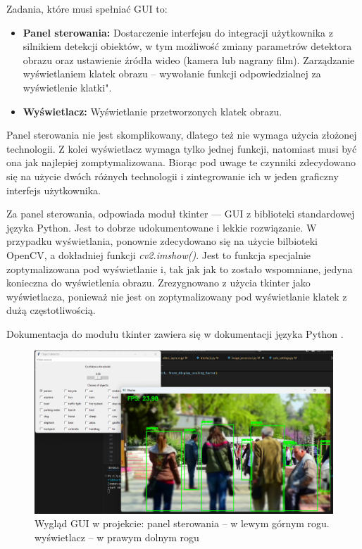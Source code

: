 Zadania, które musi spełniać GUI to:
\begin{itemize}
    \item \textbf{Panel sterowania:} Dostarczenie interfejsu do integracji użytkownika z silnikiem detekcji obiektów, w tym możliwość zmiany parametrów detektora obrazu oraz ustawienie źródła wideo (kamera lub nagrany film). Zarządzanie wyświetlaniem klatek obrazu -- wywołanie funkcji odpowiedzialnej za wyświetlenie klatki".
    \item \textbf{Wyświetlacz: } Wyświetlanie przetworzonych klatek obrazu.
\end{itemize}

Panel sterowania nie jest skomplikowany, dlatego też nie wymaga użycia złożonej technologii. Z kolei wyświetlacz wymaga tylko jednej funkcji, natomiast musi być ona jak najlepiej zomptymalizowana. Biorąc pod uwage te czynniki zdecydowano się na użycie dwóch różnych technologii i zintegrowanie ich w jeden graficzny interfejs użytkownika.

Za panel sterowania, odpowiada moduł tkinter --- GUI z biblioteki standardowej języka Python. Jest to dobrze udokumentowane i lekkie rozwiązanie. W przypadku wyświetlania, ponownie zdecydowano się na użycie bilbioteki OpenCV, a dokładniej funkcji \emph{cv2.imshow()}. Jest to funkcja specjalnie zoptymalizowana pod wyświetlanie i, tak jak jak to zostało wspomniane, jedyna konieczna do wyświetlenia obrazu.
Zrezygnowano z użycia tkinter jako wyświetlacza, ponieważ nie jest on zoptymalizowany pod wyświetlanie klatek z dużą częstotliwością. 

Dokumentacja do modułu tkinter zawiera się w dokumentacji języka Python \cite{Python_docs}.

\begin{figure}[H]
    \centering
    \includegraphics[scale = 0.23]{r_technologie/GUI_assets/mockup.png}
    \caption{Wygląd GUI w projekcie: panel sterowania -- w lewym górnym rogu. wyświetlacz -- w prawym dolnym rogu}
    \label{fig:technologies-GUI}
\end{figure}